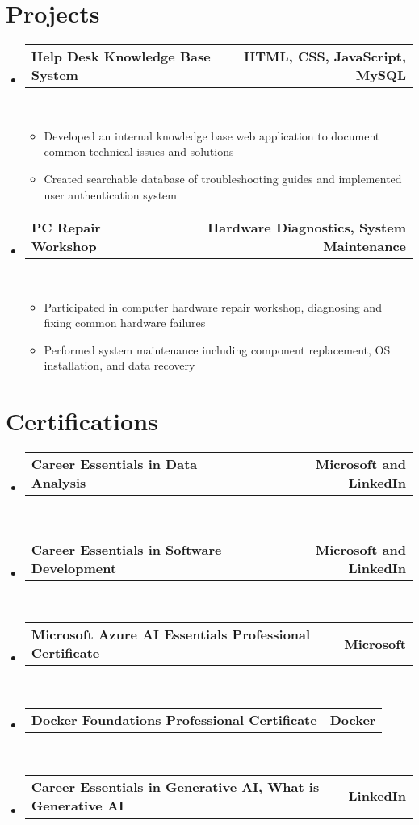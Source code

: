 \documentclass[letterpaper,11pt]{article}
\makeatletter
\newcommand{\resumeItem}[1]{
  \item\small{
    {#1 \vspace{0pt}}
  }
}
\newcommand{\resumeProjectHeading}[2]{
    \item
    \begin{tabular*}{1.001\textwidth}{l@{\extracolsep{\fill}}r}
      \small#1 & \textbf{\small #2}\\
    \end{tabular*}\vspace{-7pt}
}
\newcommand{\resumeSubHeadingListStart}{\begin{itemize}[leftmargin=0.0in, label={}]}
\newcommand{\resumeSubHeadingListEnd}{\end{itemize}}\vspace{0pt}
\newcommand{\resumeItemListStart}{\begin{itemize}}
\newcommand{\resumeItemListEnd}{\end{itemize}\vspace{-5pt}}
\makeatother
\begin{document}
\section{Projects}
    \vspace{-5pt}
    \resumeSubHeadingListStart
    \resumeProjectHeading
            {\textbf{Help Desk Knowledge Base System}}{HTML, CSS, JavaScript, MySQL}
            \\[2mm]
          \resumeItemListStart
            \resumeItem{Developed an internal knowledge base web application to document common technical issues and solutions}
            \resumeItem{Created searchable database of troubleshooting guides and implemented user authentication system}
          \resumeItemListEnd
    \resumeProjectHeading
            {\textbf{PC Repair Workshop}}{Hardware Diagnostics, System Maintenance}
            \\[2mm]
          \resumeItemListStart
            \resumeItem{Participated in computer hardware repair workshop, diagnosing and fixing common hardware failures}
            \resumeItem{Performed system maintenance including component replacement, OS installation, and data recovery}
          \resumeItemListEnd

\resumeSubHeadingListEnd
\vspace{-28pt}

\section{Certifications}
    \vspace{-5pt}
    \resumeSubHeadingListStart
          \resumeProjectHeading
            {\textbf{{Career Essentials in Data Analysis}}}{Microsoft and LinkedIn}
            \\[1mm]
          \resumeProjectHeading
            {\textbf{{Career Essentials in Software Development}}}{Microsoft and LinkedIn}
            \\[1mm]
          \resumeProjectHeading
            {\textbf{{Microsoft Azure AI Essentials Professional Certificate}}}{Microsoft}
            \\[1mm]
          \resumeProjectHeading
            {\textbf{{Docker Foundations Professional Certificate}}}{Docker}
            \\[1mm]
          \resumeProjectHeading
            {\textbf{{Career Essentials in Generative AI, What is Generative AI}}}{LinkedIn}
            \\[1mm]
          \resumeSubHeadingListEnd
 \vspace{-15pt}
\end{document}
